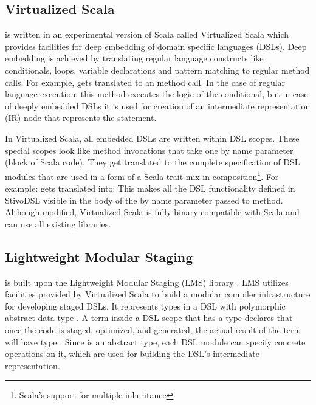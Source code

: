 \subsection{Virtualized Scala}
\label{subsec:virtualized-scala}
\tool is written in an experimental version of Scala called Virtualized Scala \cite{moors_scala-virtualized_2012} which provides facilities for deep embedding of domain specific languages (DSLs). Deep embedding is achieved by translating regular language constructs like conditionals, loops, variable declarations and pattern matching to regular method calls. For example,  gets translated to an  method call. In the case of regular language execution, this method executes the logic of the conditional, but in case of deeply embedded DSLs it is used for creation of an intermediate representation (IR) node that represents the  statement.  

In Virtualized Scala, all embedded DSLs are written within DSL scopes. These special scopes look like method invocations that take one by name parameter (block of Scala code). They get translated to the complete specification of DSL modules that are used in a form of a Scala trait mix-in composition\footnote[1]{Scala's support for multiple inheritance}. For example: 
 gets translated into:
This makes all the DSL functionality defined in StivoDSL visible in the body of the by name parameter passed to \tool method. 
Although modified, Virtualized Scala is fully binary compatible with Scala and can use all existing libraries.  


\subsection{Lightweight Modular Staging}
\label{subsec:lightweight-modular-staging}

\tool is built upon the Lightweight Modular Staging (LMS) library \cite{rompf_lightweight_2010, rompf_lightweight_2012}. LMS utilizes facilities provided by Virtualized Scala to build a modular compiler infrastructure for developing staged DSLs. It represents types in a DSL with polymorphic abstract data type . A term inside a DSL scope that has a type  declares that once the code is staged, optimized, and generated, the actual result of the term will have type . Since  is an abstract type, each DSL module can specify concrete operations on it, which are used for building the DSL's intermediate representation. 

